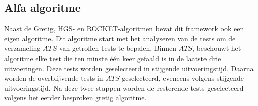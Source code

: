 \subsection{Alfa algoritme}
\noindent Naast de Gretig, HGS- en ROCKET-algoritmen bevat dit framework ook een eigen algoritme. Dit algoritme start met het analyseren van de tests om de verzameling $ATS$ van getroffen tests te bepalen. Binnen $ATS$, beschouwt het algoritme elke test die ten minste één keer gefaald is in de laatste drie uitvoeringen. Deze tests worden geselecteerd in stijgende uitvoeringstijd. Daarna worden de overblijvende tests in $ATS$ geselecteerd, eveneens volgens stijgende uitvoeringstijd. Na deze twee stappen worden de resterende tests geselecteerd volgens het eerder besproken gretig algoritme.